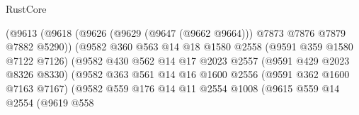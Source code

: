\begin{lexlean}{RustCore}
\begin{coremodule}
                                          (@9613
                                            (@9618
                                              (@9626
                                                (@9629 (@9647 (@9662 @9664)))
                                                @7873
                                                @7876
                                                @7879
                                                @7882
                                                @5290))
                                            (@9582
                                              @360
                                              @563
                                              @14
                                              @18
                                              @1580
                                              @2558
                                              (@9591 @359 @1580 @7122 @7126)
                                              (@9582
                                                @430
                                                @562
                                                @14
                                                @17
                                                @2023
                                                @2557
                                                (@9591 @429 @2023 @8326 @8330)
                                                (@9582
                                                  @363
                                                  @561
                                                  @14
                                                  @16
                                                  @1600
                                                  @2556
                                                  (@9591 @362 @1600 @7163 @7167)
                                                  (@9582
                                                    @559
                                                    @176
                                                    @14
                                                    @11
                                                    @2554
                                                    @1008
                                                    (@9615
                                                      @559
                                                      @14
                                                      @2554
                                                      (@9619
                                                        @558

\end{coremodule}
\end{lexlean}
